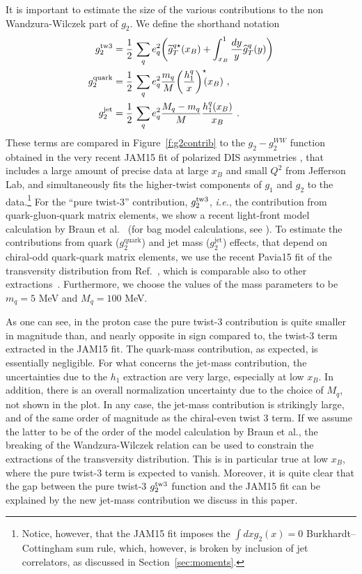 \documentclass[preprintnumbers,floatfix,nofootinbib]{revtex4}
\newcommand{\xbj}{{x_B}}                   %
\newcommand{\mj}{M_q}
\newcommand{\mq}{m_q}
\begin{document}
It is important to estimate the size of the various contributions to the non Wandzura-Wilczek part of $g_2$. We define the shorthand notation
\begin{align}
g_2^{\rm tw3} & = \frac{1}{2}\,\sum_q e_q^2
    \biggl(
    \widetilde g_T^{q \star}(\xbj) 
    + \int_\xbj^1\frac{dy}{y} \widehat{g}_T^q(y) 
    \biggr) 
\nonumber \\ 
g_2^{\text{quark}} &= \frac{1}{2}\,\sum_q e_q^2 
 \frac{\mq}{M} \bigg( \frac{h_1^q}{x} \bigg)^\star\!\!(\xbj) \ ,
\\
g_2^{\text{jet}} &= \frac{1}{2}\,\sum_q e_q^2 
\frac{\mj-\mq}{M} \frac{h_1^q(\xbj)}{\xbj} \ .
\nonumber 
\end{align} 
These terms are compared in Figure~\ref{f:g2contrib} to the $g_2-g_2^{WW}$ function obtained in the very recent JAM15 fit of polarized DIS asymmetries
\cite{Sato:2016tuz}, that includes a large amount of precise data at large $\xbj$ and small $Q^2$ from Jefferson Lab, and simultaneously fits the higher-twist components of
$g_1$ and $g_2$ to the data.\footnote{Notice, however, that the JAM15 fit imposes the $\int dx g_2(x) =0$ Burkhardt--Cottingham sum rule, which, however, is broken by inclusion of jet correlators, as discussed in Section~\ref{sec:moments}.} For the ``pure twist-3'' contribution,
$g_2^{\rm tw3}$, {\it i.e.}, the contribution from quark-gluon-quark matrix
elements, we show a recent light-front model calculation by Braun et al.~\cite{Braun:2011aw} (for bag model calculations, see \cite{Jaffe:1990qh,Stratmann:1993aw}). To estimate the contributions
from quark ($g_2^{\text{quark}}$) and jet mass ($g_2^{\text{jet}}$) effects, that depend on chiral-odd quark-quark matrix elements, we use the recent Pavia15 fit of the
transversity distribution from Ref.~\cite{Radici:2015mwa}, which is comparable
also to other 
extractions~\cite{Anselmino:2013vqa,Kang:2015msa}. Furthermore, we choose the
values of the mass parameters to be $\mq=5$ MeV and $\mj = 100$ MeV. 

As one can see, in the proton case the pure twist-3 contribution is quite
smaller in magnitude than, and nearly opposite in sign compared to, the twist-3 term extracted in the JAM15 fit. The quark-mass contribution, as expected, is essentially negligible. 
For what concerns the jet-mass contribution, the uncertainties due to the $h_1$
extraction are very large, especially at low $\xbj$. In addition, there is an
overall normalization uncertainty due to the choice of $\mj$, not shown in the
plot. In any case, the jet-mass contribution is strikingly large, and of the same order of magnitude as the chiral-even twist 3 term. If we assume the latter to be of the order of the model calculation
by Braun et al., the breaking of the Wandzura-Wilczek relation can be used to
constrain the extractions of the transversity distribution. This is in particular true at low $\xbj$, where the pure twist-3 term is expected to vanish. 
Moreover, it is quite clear that the gap
between the pure twist-3 $g_2^{\rm tw3}$ function and the JAM15 fit can be
explained by the new jet-mass contribution we discuss in this paper.  
\end{document}
